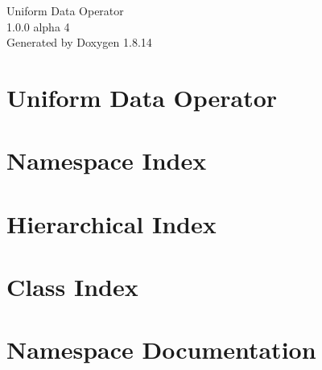 \documentclass[twoside]{book}
\newcommand{\+}{\discretionary{\mbox{\scriptsize$\hookleftarrow$}}{}{}}
\newcommand{\clearemptydoublepage}{%
  \newpage{\pagestyle{empty}\cleardoublepage}%
}
\begin{document}
\hypersetup{pageanchor=false,
             bookmarksnumbered=true,
             pdfencoding=unicode
            }
\begin{titlepage}
\vspace*{7cm}
\begin{center}%
{\Large Uniform Data Operator \\[1ex]\large 1.\+0.\+0 alpha 4 }\\
\vspace*{1cm}
{\large Generated by Doxygen 1.8.14}\\
\end{center}
\end{titlepage}
\clearemptydoublepage
{}
\tableofcontents
\clearemptydoublepage
{}
\hypersetup{pageanchor=true}

\chapter{Uniform Data Operator}
\label{md__d_1__work__git_hub_uniform-data-operator__r_e_a_d_m_e}

\chapter{Namespace Index}

\chapter{Hierarchical Index}

\chapter{Class Index}

\chapter{Namespace Documentation}











\end{document}
